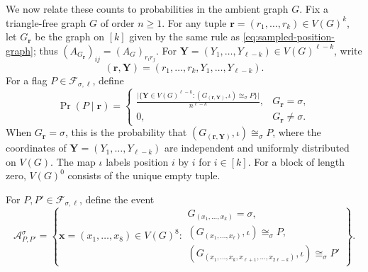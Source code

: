 We now relate these counts to probabilities in the ambient graph $G$.
Fix a triangle-free graph $G$ of order $n\geq1$.
For any tuple $\boldsymbol{r}=(r_1,\ldots,r_k)\in V(G)^k$, let $G_{\boldsymbol{r}}$ be the graph
on $[k]$ given by the same rule as
\eqref{eq:sampled-position-graph}; thus
$(A_{G_{\boldsymbol{r}}})_{ij}=(A_G)_{r_ir_j}$.
For $\boldsymbol{Y}=(Y_1,\ldots,Y_{\ell-k})\in V(G)^{\ell-k}$, write
\[
(\boldsymbol{r},\boldsymbol{Y})=(r_1,\ldots,r_k,Y_1,\ldots,Y_{\ell-k}).
\]
For a flag $P\in\mathcal F_{\sigma,\ell}$, define
\begin{equation}\label{eq:conditional-probability}
\Pr(P\mid \boldsymbol{r})=
\begin{cases}
\displaystyle
\frac{\big|\{\boldsymbol{Y}\in V(G)^{\ell-k}:
(G_{(\boldsymbol{r},\boldsymbol{Y})},\iota)\cong_\sigma P\}\big|}{n^{\ell-k}},
&G_{\boldsymbol{r}}=\sigma,\\[6pt]
0,&G_{\boldsymbol{r}}\ne\sigma.
\end{cases}
\end{equation}
When $G_{\boldsymbol{r}}=\sigma$, this is the probability that
$(G_{(\boldsymbol{r},\boldsymbol{Y})},\iota)\cong_\sigma P$, where the coordinates of
$\boldsymbol{Y}=(Y_1,\ldots,Y_{\ell-k})$ are independent and uniformly distributed
on $V(G)$.
The map $\iota$ labels position $i$ by $i$ for $i\in[k]$.
For a block of length zero, $V(G)^0$ consists of the unique empty tuple.

For $P,P'\in\mathcal F_{\sigma,\ell}$, define the event
\begin{equation}\label{eq:joint-event}
\mathcal A^\sigma_{P,P'}=
\left\{\boldsymbol{x}=(x_1,\ldots,x_8)\in V(G)^8:
\begin{array}{l}
G_{(x_1,\ldots,x_k)}=\sigma,\\
(G_{(x_1,\ldots,x_\ell)},\iota)\cong_\sigma P,\\
(G_{(x_1,\ldots,x_k,x_{\ell+1},\ldots,x_{2\ell-k})},\iota)
\cong_\sigma P'
\end{array}\right\}.
\end{equation}

